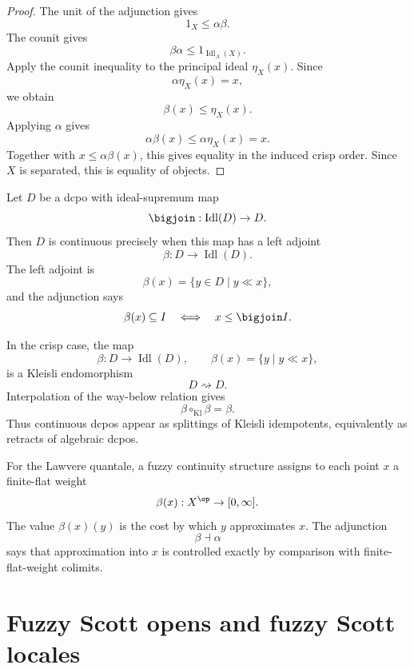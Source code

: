 \begin{proof}
The unit of the adjunction gives
\[
    1_X\leq \alpha\beta.
\]
The counit gives
\[
    \beta\alpha\leq 1_{\operatorname{Idl}_\Lambda(X)}.
\]
Apply the counit inequality to the principal ideal \(\eta_X(x)\).  Since
\[
    \alpha\eta_X(x)=x,
\]
we obtain
\[
    \beta(x)\leq\eta_X(x).
\]
Applying \(\alpha\) gives
\[
    \alpha\beta(x)\leq\alpha\eta_X(x)=x.
\]
Together with \(x\leq\alpha\beta(x)\), this gives equality in the induced crisp
order.  Since \(X\) is separated, this is equality of objects.
\end{proof}

\begin{example}
\label{ex:crisp-continuous-domains}
Let \(D\) be a dcpo with ideal-supremum map
\[
    \bigjoin:\operatorname{Idl}(D)\to D.
\]
Then \(D\) is continuous precisely when this map has a left adjoint
\[
    \beta:D\to\operatorname{Idl}(D).
\]
The left adjoint is
\[
    \beta(x)=\{y\in D\mid y\ll x\},
\]
and the adjunction says
\[
    \beta(x)\subseteq I
    \quad\Longleftrightarrow\quad
    x\leq \bigjoin I.
\]
\end{example}

\begin{example}
\label{ex:split-kleisli-idempotents-continuous}
In the crisp case, the map
\[
    \beta:D\to\operatorname{Idl}(D),
    \qquad
    \beta(x)=\{y\mid y\ll x\},
\]
is a Kleisli endomorphism
\[
    D\rightsquigarrow D.
\]
Interpolation of the way-below relation gives
\[
    \beta\circ_{\operatorname{Kl}}\beta=\beta.
\]
Thus continuous dcpos appear as splittings of Kleisli idempotents, equivalently as
retracts of algebraic dcpos.
\end{example}

\begin{example}
\label{ex:lawvere-fuzzy-continuous}
For the Lawvere quantale, a fuzzy continuity structure assigns to each point \(x\)
a finite-flat weight
\[
    \beta(x):X^{\op}\to[0,\infty].
\]
The value \(\beta(x)(y)\) is the cost by which \(y\) approximates \(x\).  The
adjunction
\[
    \beta\dashv\alpha
\]
says that approximation into \(x\) is controlled exactly by comparison with
finite-flat-weight colimits.
\end{example}

\section{Fuzzy Scott opens and fuzzy Scott locales}
\label{sec:fuzzy-scott-opens}

